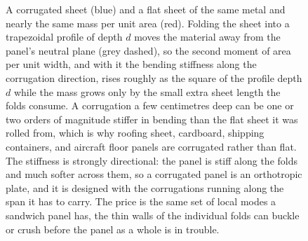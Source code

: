 \begin{figure}[htbp]
\centering
{}
\caption[Corrugated panel stiffness]{A corrugated sheet (blue) and a flat
sheet of the same metal and nearly the same mass per unit area (red). Folding
the sheet into a trapezoidal profile of depth $d$ moves the material away from
the panel's neutral plane (grey dashed), so the second moment of area per unit
width, and with it the bending stiffness along the corrugation direction,
rises roughly as the square of the profile depth $d$ while the mass grows only
by the small extra sheet length the folds consume. A corrugation a few
centimetres deep can be one or two orders of magnitude stiffer in bending than
the flat sheet it was rolled from, which is why roofing sheet, cardboard,
shipping containers, and aircraft floor panels are corrugated rather than
flat. The stiffness is strongly directional: the panel is stiff along the
folds and much softer across them, so a corrugated panel is an orthotropic
plate, and it is designed with the corrugations running along the span it has
to carry. The price is the same set of local modes a sandwich panel has, the
thin walls of the individual folds can buckle or crush before the panel as a
whole is in trouble.}
\label{fig:vol03ch09:corrugated-panel}
\end{figure}
